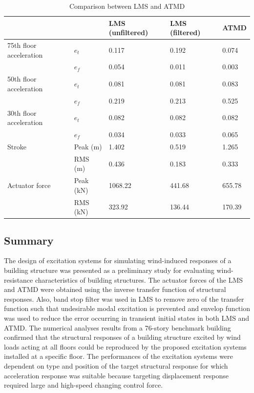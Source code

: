 \begin{table}[ht]
\centering
\begin{tabularx}{\textwidth}{@{}XX|X|X|X@{}}
\toprule[1pt]\midrule[0.3pt]
&& LMS (unfiltered) & LMS (filtered) & ATMD \\ \hline
75th floor acceleration & $e_{t}$ & 0.117 & 0.192 & 0.074 \\
& $e_{f}$ & 0.054 & 0.011 & 0.003 \\ \hline
50th floor acceleration & $e_{t}$ & 0.081 & 0.081 & 0.083 \\
& $e_{f}$ & 0.219 & 0.213 & 0.525 \\ \hline
30th floor acceleration & $e_{t}$ & 0.082 & 0.082 & 0.082 \\
& $e_{f}$ & 0.034 & 0.033 & 0.065 \\ \hline
Stroke & Peak (m) & 1.402 & 0.519 & 1.265 \\
& RMS (m) & 0.436 & 0.183 & 0.333 \\ \hline
Actuator force & Peak (kN) & 1068.22 & 441.68 & 655.78 \\
& RMS (kN) & 323.92 & 136.44 & 170.39 \\
\bottomrule
\end{tabularx}
\caption{Comparison between LMS and ATMD}
\label{tab:6-2}
\end{table}

\subsection{Summary}
The design of excitation systems for simulating wind-induced responses of a building structure was presented as a preliminary study for evaluating wind-resistance characteristics of building structures. The actuator forces of the LMS and ATMD were obtained using the inverse transfer function of structural responses. Also, band stop filter was used in LMS to remove zero of the transfer function such that undesirable modal excitation is prevented and envelop function was used to reduce the error occurring in transient initial states in both LMS and ATMD. The numerical analyses results from a 76-story benchmark building confirmed that the structural responses of a building structure excited by wind loads acting at all floors could be reproduced by the proposed excitation systems installed at a specific floor. The performances of the excitation systems were dependent on type and position of the target structural response for which acceleration response was suitable because targeting displacement response required large and high-speed changing control force.






